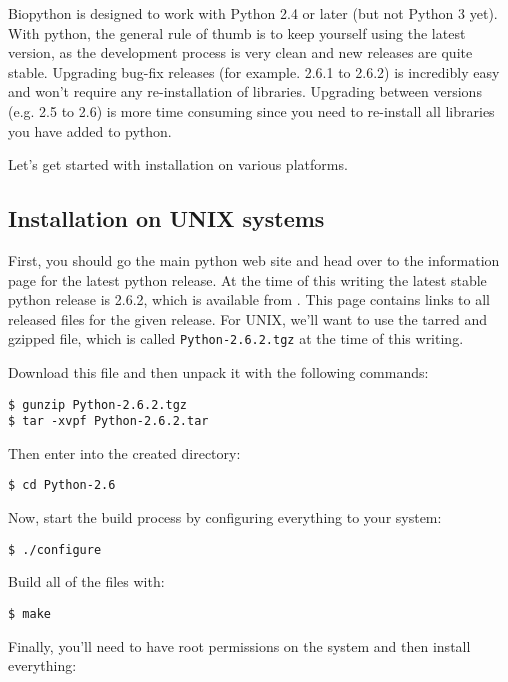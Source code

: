 \documentclass{article}
\begin{document}
Biopython is designed to work with Python 2.4 or later (but not Python 3 yet).
With python, the
general rule of thumb is to keep yourself using the latest version, as
the development process is very clean and new releases are quite stable.
Upgrading bug-fix releases (for example. 2.6.1 to 2.6.2) 
is incredibly easy and won't require any re-installation of libraries.
Upgrading between versions (e.g. 2.5 to 2.6) is more time consuming since you
need to re-install all libraries you have added to python.

Let's get started with installation on various platforms.

\subsection{Installation on UNIX systems}

First, you should go the main python web site and head over to the information
page for the latest python release. At the time of this writing the
latest stable python release is 2.6.2, which is available from
. This page contains links
to all released files for the given release. For UNIX, we'll want to use
the tarred and gzipped file, which is called \verb|Python-2.6.2.tgz| at
the time of this writing.

Download this file and then unpack it with the following commands:

\begin{verbatim}
$ gunzip Python-2.6.2.tgz 
$ tar -xvpf Python-2.6.2.tar 
\end{verbatim}

Then enter into the created directory:

\begin{verbatim}
$ cd Python-2.6
\end{verbatim}

Now, start the build process by configuring everything to your system:

\begin{verbatim}
$ ./configure
\end{verbatim}

Build all of the files with:

\begin{verbatim}
$ make
\end{verbatim}

Finally, you'll need to have root permissions on the system and then
install everything:
\end{document}
